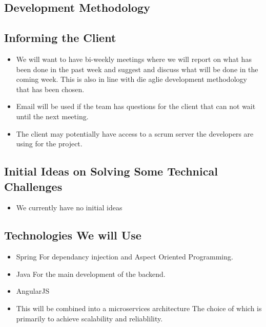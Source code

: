 \subsection{Development Methodology}


\subsection{Informing the Client}
\begin{itemize}
	\item We will want to have bi-weekly meetings where we will report on what has been done in the past week and suggest and discuss what will be done in the coming week. This is also in line with die aglie development methodology that has been chosen.
	\item Email will be used if the team has questions for the client that can not wait until the next meeting.
	\item The client may potentially have access to a scrum server the developers are using for the project.
\end{itemize}

\subsection{Initial Ideas on Solving Some Technical Challenges}
\begin{itemize}
	\item We currently have no initial ideas
\end{itemize}

\subsection{Technologies We will Use}
\begin{itemize}
	\item Spring
	For dependancy injection and Aspect Oriented Programming.
	\item Java
	For the main development of the backend.
	\item AngularJS
	\item This will be combined into a microservices architecture
	The choice of which is primarily to achieve scalability and reliablility.
\end{itemize}

